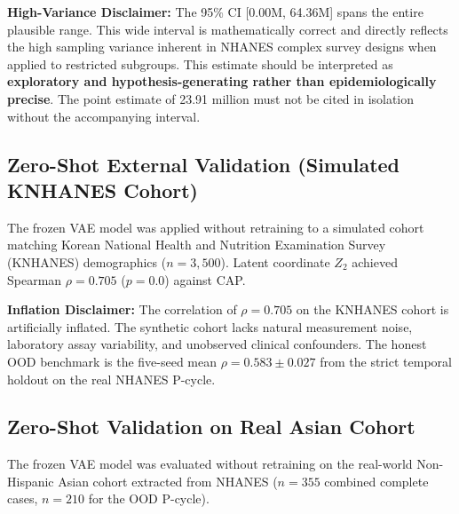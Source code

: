 \documentclass[12pt,a4paper,oneside]{report}
\begin{document}
\textbf{High-Variance Disclaimer:} The 95\% CI [0.00M, 64.36M] spans the entire plausible range. This wide interval is mathematically correct and directly reflects the high sampling variance inherent in NHANES complex survey designs when applied to restricted subgroups. This estimate should be interpreted as \textbf{exploratory and hypothesis-generating rather than epidemiologically precise}. The point estimate of 23.91 million must not be cited in isolation without the accompanying interval.

\subsection{Zero-Shot External Validation (Simulated KNHANES Cohort)}

The frozen VAE model was applied without retraining to a simulated cohort matching Korean National Health and Nutrition Examination Survey (KNHANES) demographics ($n = 3{,}500$). Latent coordinate $Z_2$ achieved Spearman $\rho = 0.705$ ($p = 0.0$) against CAP.

\textbf{Inflation Disclaimer:} The correlation of $\rho = 0.705$ on the KNHANES cohort is artificially inflated. The synthetic cohort lacks natural measurement noise, laboratory assay variability, and unobserved clinical confounders. The honest OOD benchmark is the five-seed mean $\rho = 0.583 \pm 0.027$ from the strict temporal holdout on the real NHANES P-cycle.

\subsection{Zero-Shot Validation on Real Asian Cohort}

The frozen VAE model was evaluated without retraining on the real-world Non-Hispanic Asian cohort extracted from NHANES ($n = 355$ combined complete cases, $n = 210$ for the OOD P-cycle).

\begin{table}[H]
\centering
\caption{Model performance on real Asian cohort.}
\label{tab:asian}
\end{table}
\end{document}
